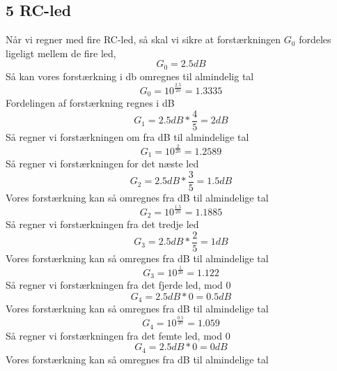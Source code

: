  \subsection{5 RC-led}
%
Når vi regner med fire RC-led, så skal vi sikre at forstærkningen $G_{0}$ fordeles ligeligt mellem de fire led, 
%
\begin{equation}
	G_0 = 2.5dB
\end{equation}
\noindent
%
Så kan vores forstærkning i db omregnes til almindelig tal
%
\begin{equation}
	G_0 = 10^{\frac{2.5}{20}} = 1.3335
\end{equation}
\noindent
%
Fordelingen af forstærkning regnes i dB
%
\begin{equation}
	G_1 = 2.5dB*\frac{4}{5} = 2dB
\end{equation}
\noindent
%
Så regner vi forstærkningen om fra dB til almindelige tal
%
\begin{equation}
	G_1 = 10^{\frac{2}{20}} = 1.2589
\end{equation}
\noindent
%
Så regner vi forstærkningen for det næste led
%
\begin{equation}
	G_2 = 2.5dB*\frac{3}{5} = 1.5dB
\end{equation}
\noindent
%
Vores forstærkning kan så omregnes fra dB til almindelige tal
%
\begin{equation}
	G_2 = 10^{\frac{1.5}{20}} = 1.1885
\end{equation}
\noindent
%
Så regner vi forstærkningen fra det tredje led 
%
\begin{equation}
	G_3 = 2.5dB*\frac{2}{5} = 1dB
\end{equation}
\noindent
%
Vores forstærkning kan så omregnes fra dB til almindelige tal
%
\begin{equation}
	G_3 = 10^{\frac{1}{20}} = 1.122
\end{equation}
\noindent
%
Så regner vi forstærkningen fra det fjerde led, mod 0 
%
\begin{equation}
	G_4 = 2.5dB*0 = 0.5dB
\end{equation}
\noindent
%
Vores forstærkning kan så omregnes fra dB til almindelige tal
%
\begin{equation}
	G_4 = 10^{\frac{0.5}{20}} = 1.059
\end{equation}
\noindent
%
Så regner vi forstærkningen fra det femte led, mod 0 
%
\begin{equation}
	G_4 = 2.5dB*0 = 0dB
\end{equation}
\noindent
%
Vores forstærkning kan så omregnes fra dB til almindelige tal
